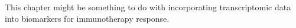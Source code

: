 \documentclass[../thesis.tex]{subfiles}
\begin{document}
This chapter might be something to do with incorporating transcriptomic data into biomarkers for immunotherapy response.

\dobib %
\end{document}
